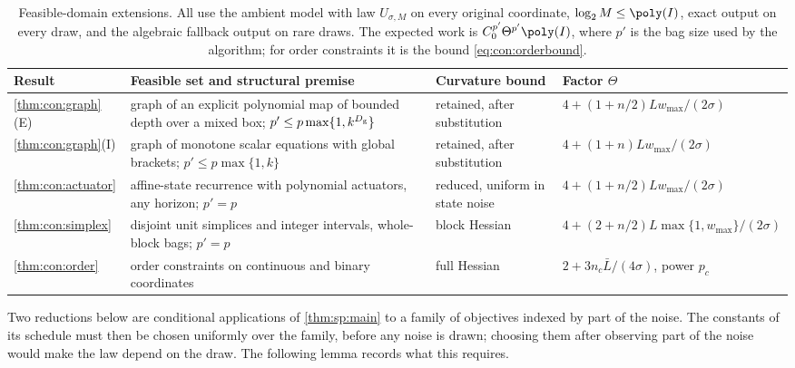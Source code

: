 \begin{table}[t]
\centering
\caption{Feasible-domain extensions. All use the ambient model with law
$U_{\sigma,M}$ on every original coordinate, $\log_2M\le\poly(I)$, exact
output on every draw, and the algebraic fallback output on rare draws. The
expected work is $C_0^{p'}\Theta^{p'}\poly(I)$, where $p'$ is the bag size
used by the algorithm; for order constraints it is the bound
\eqref{eq:con:orderbound}.}
\label{tab:con:summary}
\footnotesize
\begin{tabularx}{\textwidth}{@{}l>{\raggedright\arraybackslash}X>{\raggedright\arraybackslash}p{}l@{}}
\toprule
Result & Feasible set and structural premise & Curvature bound & Factor $\Theta$\\
\midrule
\cref{thm:con:graph}(E) & graph of an explicit polynomial map of bounded
depth over a mixed box; $p'\le p\max\{1,k^{D_{\rm g}}\}$ & retained, after
substitution & $4+(1+n/2)Lw_{\max}/(2\sigma)$\\
\cref{thm:con:graph}(I) & graph of monotone scalar equations with global
brackets; $p'\le p\max\{1,k\}$ & retained, after substitution &
$4+(1+n)Lw_{\max}/(2\sigma)$\\
\cref{thm:con:actuator} & affine-state recurrence with polynomial
actuators, any horizon; $p'=p$ & reduced, uniform in state noise &
$4+(1+n/2)Lw_{\max}/(2\sigma)$\\
\cref{thm:con:simplex} & disjoint unit simplices and integer intervals,
whole-block bags; $p'=p$ & block Hessian & $4+(2+n/2)L\max\{1,w_{\max}\}/(2\sigma)$\\
\cref{thm:con:order} & order constraints on continuous and binary
coordinates & full Hessian & $2+3n_c\bar L/(4\sigma)$, power $p_c$\\
\bottomrule
\end{tabularx}
\end{table}

Two reductions below are conditional applications of \cref{thm:sp:main} to
a family of objectives indexed by part of the noise. The constants of its
schedule must then be chosen uniformly over the family, before any noise is
drawn; choosing them after observing part of the noise would make the law
depend on the draw. The following lemma records what this requires.

